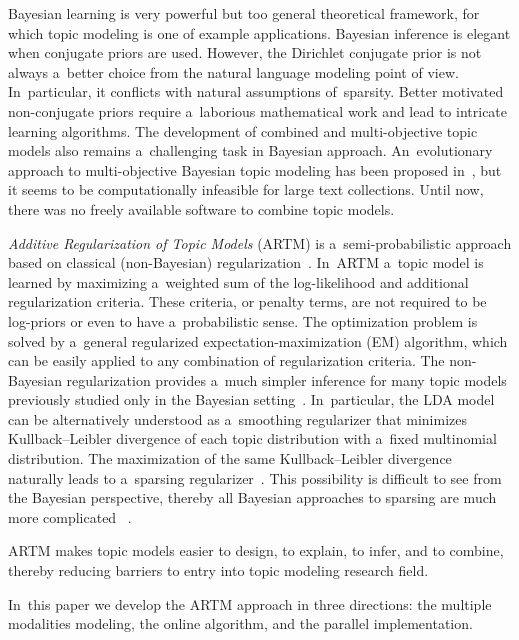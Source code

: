 \documentclass{sig-alternate}
\begin{document}
Bayesian learning is very powerful but too general theoretical framework,
for which topic modeling is one of example applications.
Bayesian inference is elegant when conjugate priors are used.
However, the Dirichlet conjugate prior
is not always a~better choice from the natural language modeling point of view.
In~particular, it conflicts with natural assumptions of~sparsity.
Better motivated non-conjugate priors
require a~laborious mathematical work and
lead to intricate learning algorithms.
The development of combined and multi-objective topic models also remains a~challenging task in Bayesian approach.
An~evolutionary approach to multi-objective Bayesian topic modeling has been proposed in~\cite{khalifa13multi},
but it seems to be computationally infeasible for large text collections.
Until now, there was no freely available software to combine topic models.

\emph{Additive Regularization of Topic Models} (ARTM)
is a~semi-probabilistic approach based on classical (non-Bayesian) regularization~\cite{voron14dan-eng}. 
In~ARTM a~topic model is learned by maximizing a~weighted sum
of the log-likelihood and additional regularization criteria.
These criteria, or penalty terms,
are not required to be log-priors or even to have a~probabilistic sense.
The optimization problem is solved by a~general regularized expectation-maximization (EM) algorithm,
which can be easily applied to any combination of regularization criteria.
The non-Bayesian regularization provides a~much simpler inference
for many topic models previously studied only in the Bayesian setting~\cite{voron14aist,voron14mlj}.
In~particular,
the LDA model can be alternatively understood as a~smoothing regularizer
that minimizes Kullback--Leibler divergence
of each topic distribution with a~fixed multinomial distribution.
The maximization of the same Kullback--Leibler divergence
naturally leads to a~sparsing regularizer~\cite{voron14aist}.
This possibility is difficult to see from the Bayesian perspective,
thereby all Bayesian approaches to sparsing are much more complicated~%
\cite{shashanka07sparse,wang09decoupling,ugander11concave,eisenstein11sparse,chien13bayesian}.

ARTM makes topic models easier to design, to explain, to infer, and to combine,
thereby reducing barriers to entry into topic modeling research field.

In~this paper we develop the ARTM approach in three directions:
the multiple modalities modeling,
the online algorithm, and
the parallel implementation.
\end{document}
